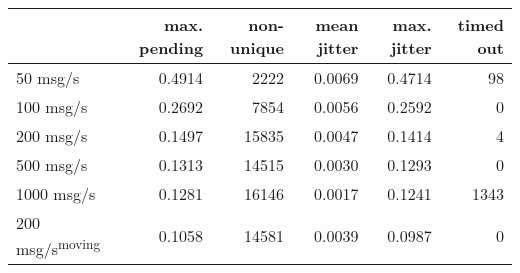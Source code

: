 \begin{tabular}{l|rrrrr}
\rowcolor{gray!50}
 & max. pending & non-unique & mean jitter & max. jitter & timed out\\\hline
50 msg/s & 0.4914 & 2222 & 0.0069 & 0.4714 & 98 \\
100 msg/s & 0.2692 & 7854 & 0.0056 & 0.2592 & 0 \\
200 msg/s & 0.1497 & 15835 & 0.0047 & 0.1414 & 4 \\
500 msg/s & 0.1313 & 14515 & 0.0030 & 0.1293 & 0 \\
1000 msg/s & 0.1281 & 16146 & 0.0017 & 0.1241 & 1343 \\
200 msg/s\textsuperscript{moving} & 0.1058 & 14581 & 0.0039 & 0.0987 & 0 \\
\end{tabular}
